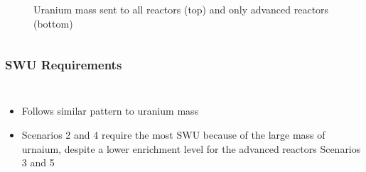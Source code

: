 \begin{frame}
\begin{columns}
\begin{figure}
\begin{subfigure}
                \label{fig:fuel_advancedRX}
            \end{subfigure}
            \caption{Uranium mass sent to all reactors (top)
            and only advanced reactors (bottom)}
            \label{fig:fuel}
        \end{figure}
    \end{columns}
    

\end{frame}

\begin{frame}
    \frametitle{\gls{SWU} Requirements}
    \begin{columns}
        \column[t]{5cm}
            \begin{itemize}
                \item Follows similar pattern to uranium mass 
                \item Scenarios 2 and 4 require the most \gls{SWU} 
                      because of the large mass of urnaium, despite a 
                      lower enrichment level for the advanced reactors 
                      Scenarios 3 and 5
                

\end{itemize}
\end{columns}
\end{frame}
